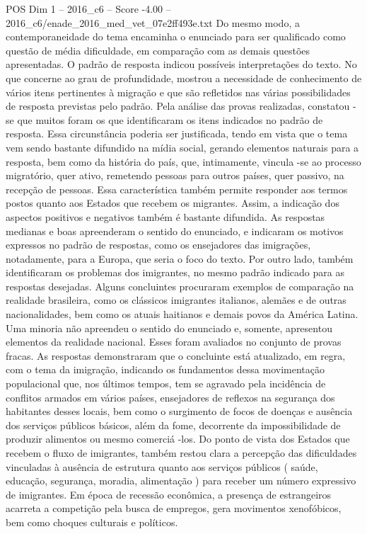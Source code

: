 \begin{textsample}{POS Dim 1 – 2016\_c6 – Score -4.00 – 2016\_c6/enade\_2016\_med\_vet\_07e2ff493e.txt}
Do mesmo modo, a contemporaneidade do tema encaminha o enunciado para ser qualificado como questão de média dificuldade, em comparação com as demais questões apresentadas.
O padrão de resposta indicou possíveis interpretações do texto.
No que concerne ao grau de profundidade, mostrou a necessidade de conhecimento de vários itens pertinentes à migração e que são refletidos nas várias possibilidades de resposta previstas pelo padrão.
Pela análise das provas realizadas, constatou -se que muitos foram os que identificaram os itens indicados no padrão de resposta.
Essa circunstância poderia ser justificada, tendo em vista que o tema vem sendo bastante difundido na mídia social, gerando elementos naturais para a resposta, bem como da história do país, que, intimamente, vincula -se ao processo migratório, quer ativo, remetendo pessoas para outros países, quer passivo, na recepção de pessoas.
Essa característica também permite responder aos termos postos quanto aos Estados que recebem os migrantes.
Assim, a indicação dos aspectos positivos e negativos também é bastante difundida.
As respostas medianas e boas apreenderam o sentido do enunciado, e indicaram os motivos expressos no padrão de respostas, como os ensejadores das imigrações, notadamente, para a Europa, que seria o foco do texto.
Por outro lado, também identificaram os problemas dos imigrantes, no mesmo padrão indicado para as respostas desejadas.
Alguns concluintes procuraram exemplos de comparação na realidade brasileira, como os clássicos imigrantes italianos, alemães e de outras nacionalidades, bem como os atuais haitianos e demais povos da América Latina.
Uma minoria não apreendeu o sentido do enunciado e, somente, apresentou elementos da realidade nacional.
Esses foram avaliados no conjunto de provas fracas.
As respostas demonstraram que o concluinte está atualizado, em regra, com o tema da imigração, indicando os fundamentos dessa movimentação populacional que, nos últimos tempos, tem se agravado pela incidência de conflitos armados em vários países, ensejadores de reflexos na segurança dos habitantes desses locais, bem como o surgimento de focos de doenças e ausência dos serviços públicos básicos, além da fome, decorrente da impossibilidade de produzir alimentos ou mesmo comerciá -los.
Do ponto de vista dos Estados que recebem o fluxo de imigrantes, também restou clara a percepção das dificuldades vinculadas à ausência de estrutura quanto aos serviços públicos ( saúde, educação, segurança, moradia, alimentação ) para receber um número expressivo de imigrantes.
Em época de recessão econômica, a presença de estrangeiros acarreta a competição pela busca de empregos, gera movimentos xenofóbicos, bem como choques culturais e políticos.

\end{textsample}
